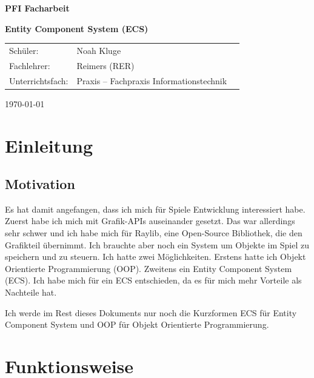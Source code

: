 \documentclass[12pt, a4paper, oneside, ngerman]{scrartcl}
\newcommand{\ProjectType}{PFI Facharbeit}
\newcommand{\ProjectTopicShort}{ECS}
\newcommand{\ProjectTopic}{Entity Component System (\ProjectTopicShort)}
\newcommand{\ProjectTeacherShort}{RER}
\newcommand{\ProjectTeacher}{Reimers (\ProjectTeacherShort)}
\newcommand{\ProjectSubject}{Praxis – Fachpraxis Informationstechnik}
\newcommand{\ProjectStudent}{Noah Kluge}
\begin{document}
\begin{titlepage}
	\thispagestyle{empty}
	\centering
	\vspace*{2cm}
	{\Huge \textbf{\ProjectType}}
	\vspace*{0.5cm}

	{\Huge \textbf{\ProjectTopic}}
	\vspace*{5cm}
	\begin{table}[h]
		\centering
		\begin{tabular}{lll}
			Schüler:         & \ProjectStudent \\
			Fachlehrer:      & \ProjectTeacher \\
			Unterrichtsfach: & \ProjectSubject \\
		\end{tabular}
	\end{table}
	\vfill
	\today
\end{titlepage}

\newpage
\pagestyle{directories}
\tableofcontents
\listoftables
\listoffigures
\listoflistings

\newpage
\pagestyle{mainpart}

\section{Einleitung}
\subsection{Motivation}
Es hat damit angefangen, dass ich mich für Spiele Entwicklung interessiert habe.
Zuerst habe ich mich mit Grafik-APIs auseinander gesetzt.
Das war allerdings sehr schwer und ich habe mich für Raylib, eine Open-Source Bibliothek, die den Grafikteil übernimmt.
Ich brauchte aber noch ein System um Objekte im Spiel zu speichern und zu steuern.
Ich hatte zwei Möglichkeiten.
Erstens hatte ich Objekt Orientierte Programmierung (OOP).
Zweitens ein Entity Component System (ECS).
Ich habe mich für ein ECS entschieden, da es für mich mehr Vorteile als Nachteile hat.

\begin{myNote}
	Ich werde im Rest dieses Dokuments nur noch die Kurzformen ECS für Entity Component System und OOP für Objekt Orientierte Programmierung.
\end{myNote}

\section{Funktionsweise}
\end{document}
